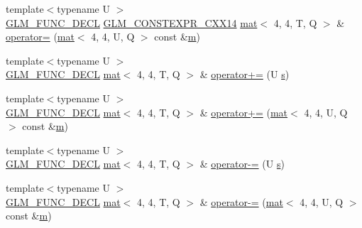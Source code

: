 \begin{DoxyCompactItemize}
\item 
{\footnotesize template$<$typename U $>$ }\\\mbox{\hyperlink{setup_8hpp_ab2d052de21a70539923e9bcbf6e83a51}{G\+L\+M\+\_\+\+F\+U\+N\+C\+\_\+\+D\+E\+CL}} \mbox{\hyperlink{setup_8hpp_a4dd12abf5e1164bc57f3a34671d03844}{G\+L\+M\+\_\+\+C\+O\+N\+S\+T\+E\+X\+P\+R\+\_\+\+C\+X\+X14}} \mbox{\hyperlink{structglm_1_1mat}{mat}}$<$ 4, 4, T, Q $>$ \& \mbox{\hyperlink{structglm_1_1mat_3_014_00_014_00_01_t_00_01_q_01_4_a240690716d4c5dc0b562b051b5fc71af}{operator=}} (\mbox{\hyperlink{structglm_1_1mat}{mat}}$<$ 4, 4, U, Q $>$ const \&\mbox{\hyperlink{_s_d_l__opengl__glext_8h_af593500c283bf1a787a6f947f503a5c2}{m}})
\item 
{\footnotesize template$<$typename U $>$ }\\\mbox{\hyperlink{setup_8hpp_ab2d052de21a70539923e9bcbf6e83a51}{G\+L\+M\+\_\+\+F\+U\+N\+C\+\_\+\+D\+E\+CL}} \mbox{\hyperlink{structglm_1_1mat}{mat}}$<$ 4, 4, T, Q $>$ \& \mbox{\hyperlink{structglm_1_1mat_3_014_00_014_00_01_t_00_01_q_01_4_a0f815cdd7d2c4c961195e562a57b588b}{operator+=}} (U \mbox{\hyperlink{_s_d_l__opengl_8h_a4af680a6c683f88ed67b76f207f2e6e4}{s}})
\item 
{\footnotesize template$<$typename U $>$ }\\\mbox{\hyperlink{setup_8hpp_ab2d052de21a70539923e9bcbf6e83a51}{G\+L\+M\+\_\+\+F\+U\+N\+C\+\_\+\+D\+E\+CL}} \mbox{\hyperlink{structglm_1_1mat}{mat}}$<$ 4, 4, T, Q $>$ \& \mbox{\hyperlink{structglm_1_1mat_3_014_00_014_00_01_t_00_01_q_01_4_adcd94cc67c06e39342acf446e1859b52}{operator+=}} (\mbox{\hyperlink{structglm_1_1mat}{mat}}$<$ 4, 4, U, Q $>$ const \&\mbox{\hyperlink{_s_d_l__opengl__glext_8h_af593500c283bf1a787a6f947f503a5c2}{m}})
\item 
{\footnotesize template$<$typename U $>$ }\\\mbox{\hyperlink{setup_8hpp_ab2d052de21a70539923e9bcbf6e83a51}{G\+L\+M\+\_\+\+F\+U\+N\+C\+\_\+\+D\+E\+CL}} \mbox{\hyperlink{structglm_1_1mat}{mat}}$<$ 4, 4, T, Q $>$ \& \mbox{\hyperlink{structglm_1_1mat_3_014_00_014_00_01_t_00_01_q_01_4_ae97fef5ac1d3b3b1b51ab496c7c02877}{operator-\/=}} (U \mbox{\hyperlink{_s_d_l__opengl_8h_a4af680a6c683f88ed67b76f207f2e6e4}{s}})
\item 
{\footnotesize template$<$typename U $>$ }\\\mbox{\hyperlink{setup_8hpp_ab2d052de21a70539923e9bcbf6e83a51}{G\+L\+M\+\_\+\+F\+U\+N\+C\+\_\+\+D\+E\+CL}} \mbox{\hyperlink{structglm_1_1mat}{mat}}$<$ 4, 4, T, Q $>$ \& \mbox{\hyperlink{structglm_1_1mat_3_014_00_014_00_01_t_00_01_q_01_4_a63a67f742e051a407c621365d67af38a}{operator-\/=}} (\mbox{\hyperlink{structglm_1_1mat}{mat}}$<$ 4, 4, U, Q $>$ const \&\mbox{\hyperlink{_s_d_l__opengl__glext_8h_af593500c283bf1a787a6f947f503a5c2}{m}})

\end{DoxyCompactItemize}
